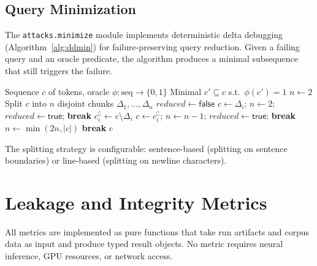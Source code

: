 \documentclass[11pt,a4paper]{article}
\begin{document}
\subsection{Query Minimization}

The \texttt{attacks.minimize} module implements deterministic delta
debugging (Algorithm~\ref{alg:ddmin}) for failure-preserving query reduction.
Given a failing query and an oracle predicate, the algorithm produces a
minimal subsequence that still triggers the failure.

\begin{algorithm}[H]
\caption{Deterministic Delta Debugging (\texttt{ddmin})}
\label{alg:ddmin}
\begin{algorithmic}[1]
\Require Sequence $c$ of tokens, oracle $\phi: \text{seq} \to \{0,1\}$
\Ensure Minimal $c' \subseteq c$ s.t.\ $\phi(c') = 1$
\State $n \gets 2$
  \State Split $c$ into $n$ disjoint chunks $\Delta_1, \ldots, \Delta_n$
  \State $\mathit{reduced} \gets \mathsf{false}$
      \State $c \gets \Delta_i$; $n \gets 2$; $\mathit{reduced} \gets \mathsf{true}$; \textbf{break}
    \EndIf
  \EndFor
      \State $c_i^{\complement} \gets c \setminus \Delta_i$
        \State $c \gets c_i^{\complement}$; $n \gets n-1$; $\mathit{reduced} \gets \mathsf{true}$; \textbf{break}
      \EndIf
    \EndFor
  \EndIf
      \State $n \gets \min(2n, |c|)$
    \Else
      \State \textbf{break}
    \EndIf
  \EndIf
\EndWhile
\State \Return $c$
\end{algorithmic}
\end{algorithm}

The splitting strategy is configurable: sentence-based (splitting on
sentence boundaries) or line-based (splitting on newline characters).

\section{Leakage and Integrity Metrics}\label{sec:metrics}

All metrics are implemented as pure functions that take run artifacts and
corpus data as input and produce typed result objects. No metric requires
neural inference, GPU resources, or network access.
\end{document}
